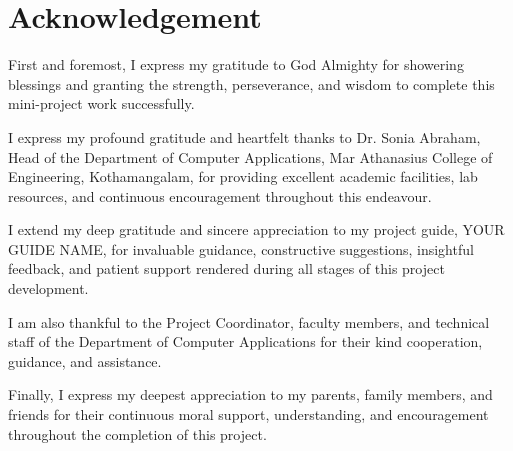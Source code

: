 \documentclass[12pt,a4paper]{report}
\renewcommand{\headrulewidth}{0.4pt}
\renewcommand{\footrulewidth}{0.4pt}
\renewcommand{\headrulewidth}{0.4pt}
\renewcommand{\footrulewidth}{0.4pt}
\begin{document}
\onehalfspacing


\newpage
{}
\setcounter{page}{1}


\pagestyle{fancy}
\fancyhf{}
\fancyfoot[C]{\thepage}

\renewcommand{\headrulewidth}{0pt}
\renewcommand{\footrulewidth}{0pt}

\fancypagestyle{plain}{
    \fancyhf{}
    \fancyfoot[C]{\thepage}
    \renewcommand{\headrulewidth}{0pt}
    \renewcommand{\footrulewidth}{0pt}
}


\chapter*{Acknowledgement}
{}

First and foremost, I express my gratitude to God Almighty
for showering blessings and granting the strength,
perseverance, and wisdom to complete this mini-project
work successfully.

I express my profound gratitude and heartfelt thanks to
Dr. Sonia Abraham, Head of the Department of Computer
Applications, Mar Athanasius College of Engineering,
Kothamangalam, for providing excellent academic facilities,
lab resources, and continuous encouragement throughout
this endeavour.

I extend my deep gratitude and sincere appreciation to
my project guide, YOUR GUIDE NAME, for invaluable
guidance, constructive suggestions, insightful feedback,
and patient support rendered during all stages of
this project development.

I am also thankful to the Project Coordinator,
faculty members, and technical staff of the
Department of Computer Applications for their
kind cooperation, guidance, and assistance.

Finally, I express my deepest appreciation to my
parents, family members, and friends for their
continuous moral support, understanding, and
encouragement throughout the completion of
this project.

\vspace{1.5cm}
\end{document}
